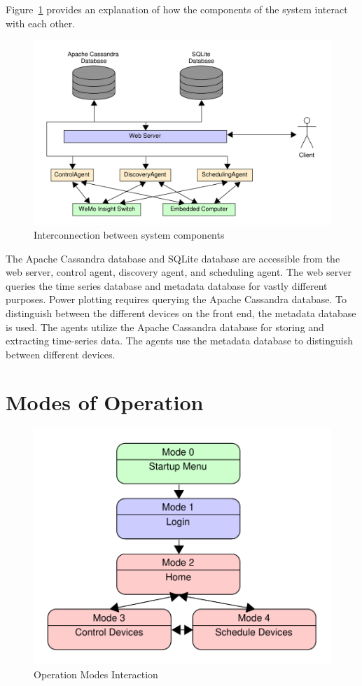 Figure~\ref{fig:systemComponentInterconnection} provides an explanation of how
the components of the system interact with each other. %
%
\begin{figure}
  \centering
  \includegraphics[scale=0.6]{figs/overallDiagram.pdf}
  \caption{Interconnection between system components}
  \label{fig:systemComponentInterconnection}
\end{figure}
%
The Apache Cassandra database and SQLite database are accessible from the web server, control agent, discovery agent, and scheduling agent. The web server queries the time series database and metadata database for vastly different purposes. Power plotting requires querying the Apache Cassandra database. To distinguish between the different devices on the front end, the metadata database is used. The agents utilize the Apache Cassandra database for storing and extracting time-series data. The agents use the metadata database to distinguish between different devices. 

\section{Modes of Operation}


\begin{figure}
  \centering
  \includegraphics[scale=0.4]{figs/operationalModes.pdf}
  \caption{Operation Modes Interaction}
  \label{fig:operationalModes}
\end{figure}

